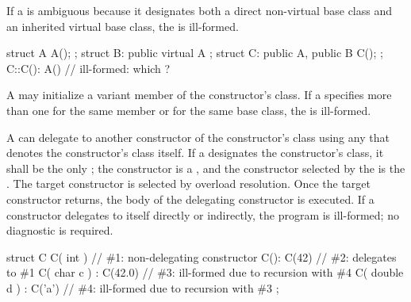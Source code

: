 \pnum
If a
is ambiguous because it designates both a direct non-virtual base class and
an inherited virtual base class, the
is ill-formed.
\begin{example}

\begin{codeblock}
struct A { A(); };
struct B: public virtual A { };
struct C: public A, public B { C(); };
C::C(): A() { }                 // ill-formed: which ?
\end{codeblock}
\end{example}

\pnum
A
may initialize a variant member of the
constructor's class.
If a
specifies more than one
for the same member or for the same base class,
the
is ill-formed.

\pnum
A  can delegate to another
constructor of the constructor's class using any
 that denotes the constructor's class itself. If a
 designates the constructor's class,
it shall be the only ; the constructor
is a , and the constructor selected by the
 is the .
The target constructor is selected by overload resolution.
Once the target constructor returns, the body of the delegating constructor
is executed. If a constructor delegates to itself directly or indirectly,
the program is ill-formed; no diagnostic is required. \begin{example}

\begin{codeblock}
struct C {
  C( int ) { }                  // \#1: non-delegating constructor
  C(): C(42) { }                // \#2: delegates to \#1
  C( char c ) : C(42.0) { }     // \#3: ill-formed due to recursion with \#4
  C( double d ) : C('a') { }    // \#4: ill-formed due to recursion with \#3
};
\end{codeblock}
\end{example}

